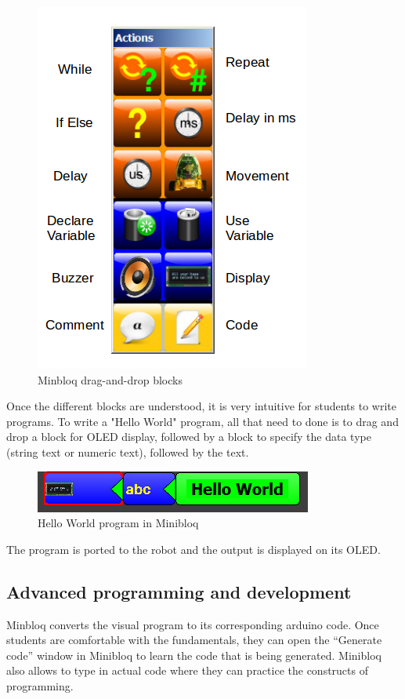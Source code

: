 \documentclass[conference]{IEEEtran}
\begin{document}
\begin{figure}[h]
\centering
\includegraphics[scale=0.3]{Fig_09.png}
\caption{Minbloq drag-and-drop blocks}
\end{figure}

Once the different blocks are understood, it is very intuitive for students to write programs. To write a "Hello World" program, all that need to done is to drag and drop a block for OLED display, followed by a block to specify the data type (string text or numeric text), followed by the text.

\begin{figure}[h]
\centering
\includegraphics[scale=0.5]{Fig_10.png}
\caption{Hello World program in Minibloq}
\end{figure}

The program is ported to the robot and the output is displayed on its OLED.

\subsection{Advanced programming and development}
Minbloq converts the visual program to its corresponding arduino code. Once students are comfortable with the fundamentals, they can open the “Generate code” window in Minibloq to learn the code that is being generated. Minibloq also allows to type in actual code where they can practice the constructs of programming.
\end{document}
